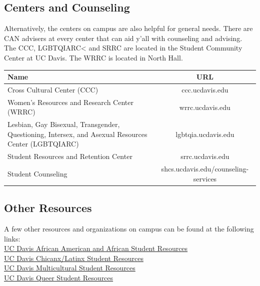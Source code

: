 \documentclass{article}
\begin{document}
\subsection{Centers and Counseling}
Alternatively, the centers on campus are also helpful for general needs. There are CAN advisers at every center that can aid y'all with counseling and advising. The CCC, LGBTQIARC< and SRRC are located in the Student Community Center at UC Davis. The WRRC is located in North Hall.\\ 

\begin{tabular} {|p{8cm}|c|}
\hline
\textbf{Name} & \textbf{URL} \\
\hline
Cross Cultural Center (CCC) & ccc.ucdavis.edu \\
\hline
Women's Resources and Research Center (WRRC) & wrrc.ucdavis.edu\\
\hline
Lesbian, Gay Bisexual, Transgender, Questioning, Intersex, and Asexual Resources Center (LGBTQIARC) & lgbtqia.ucdavis.edu \\
\hline
Student Resources and Retention Center & srrc.ucdavis.edu \\
\hline
Student Counseling & shcs.ucdavis.edu/counseling-services \\
\hline
\end{tabular}

\subsection {Other Resources} 
A few other resources and organizations on campus can be found at the following links:  \\

\href{https://www.ucdavis.edu/admissions/undergraduate/community/african-american-student-resources/}{UC Davis African American and African Student Resources}\\

\href{https://www.ucdavis.edu/admissions/undergraduate/community/latino-chicano-organizations/}{UC Davis Chicanx/Latinx Student Resources}\\

\href{https://www.ucdavis.edu/admissions/undergraduate/community/}{UC Davis Multicultural Student Resources}\\

\href{http://lgbtqia.ucdavis.edu/connected/student-org.html}{UC Davis Queer Student Resources}\\
\end{document}
